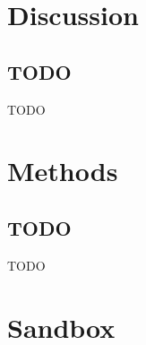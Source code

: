 \documentclass[a4paper,11pt,abstracton,hidelinks]{scrartcl}
\begin{document}
\section*{Discussion}


\subsection*{TODO}


TODO


\section*{Methods}


\subsection*{TODO}

TODO


\section*{Sandbox}
\end{document}
